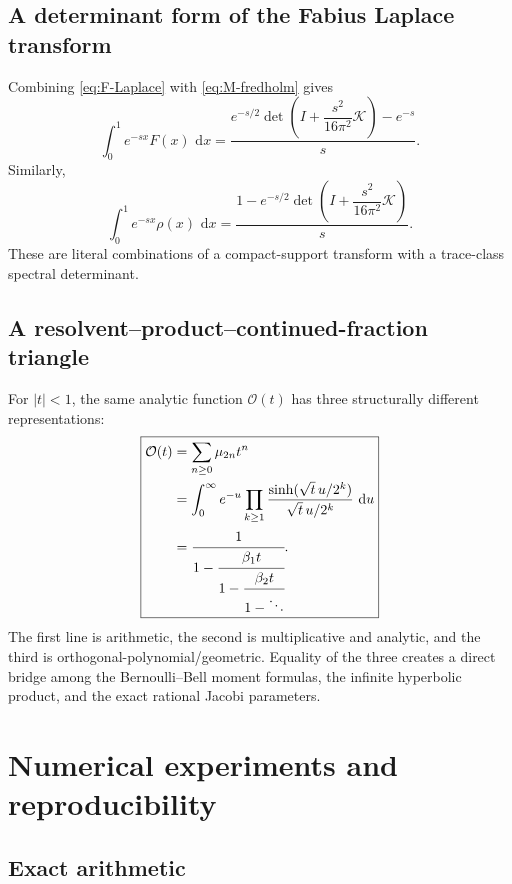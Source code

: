 \documentclass[11pt]{article}
\theoremstyle{definition}
\theoremstyle{remark}
\newcommand{\dd}{\,\mathrm d}
\newcommand{\cO}{\mathcal O}
\newcommand{\cK}{\mathcal K}
\begin{document}
\subsection{A determinant form of the Fabius Laplace transform}

Combining \eqref{eq:F-Laplace} with \eqref{eq:M-fredholm} gives
\begin{equation}
 \int_0^1e^{-sx}F(x)\,\dd x
 =\frac{e^{-s/2}
 \det\!\left(I+\dfrac{s^2}{16\pi^2}\cK\right)-e^{-s}}{s}.  \label{eq:F-Laplace-determinant}
\end{equation}
Similarly,
\begin{equation}
 \int_0^1e^{-sx}\rho(x)\,\dd x
 =\frac{1-e^{-s/2}
 \det\!\left(I+\dfrac{s^2}{16\pi^2}\cK\right)}{s}.         \label{eq:rho-half-determinant}
\end{equation}
These are literal combinations of a compact-support transform with a trace-class spectral
determinant.

\subsection{A resolvent--product--continued-fraction triangle}

For \(|t|<1\), the same analytic function \(\cO(t)\) has three structurally different
representations:
\begin{equation}
 \boxed{
 \begin{aligned}
 \cO(t)
 &=\sum_{n\ge0}\mu_{2n}t^n\\
 &=\int_0^{\infty}e^{-u}
   \prod_{k\ge1}\frac{\sinh(\sqrt t\,u/2^k)}{\sqrt t\,u/2^k}\,\dd u\\
 &=\cfrac{1}{1-\cfrac{\beta_1t}{1-\cfrac{\beta_2t}{1-\ddots}}}.
 \end{aligned}
 }                                                           \label{eq:triangle}
\end{equation}
The first line is arithmetic, the second is multiplicative and analytic, and the third is
orthogonal-polynomial/geometric.  Equality of the three creates a direct bridge among the
Bernoulli--Bell moment formulas, the infinite hyperbolic product, and the exact rational
Jacobi parameters.

\section{Numerical experiments and reproducibility}

\subsection{Exact arithmetic}
\end{document}
